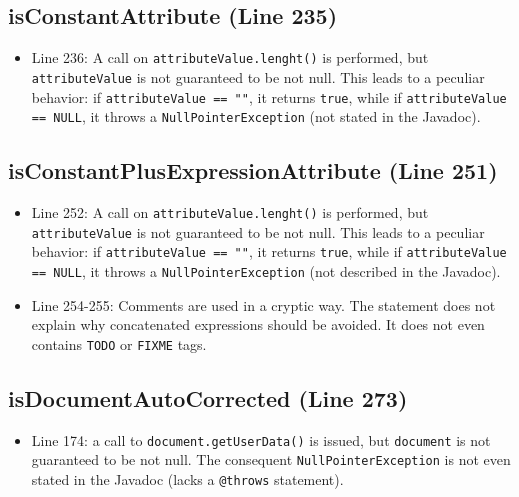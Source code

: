 \documentclass[11pt]{article} %
\begin{document}
\subsection{isConstantAttribute (Line 235)}
\begin{itemize}
	\item Line 236: A call on \texttt{attributeValue.lenght()} is performed, but \texttt{attributeValue} is not guaranteed to be not null. This leads to a peculiar behavior: if \texttt{attributeValue == ""}, it returns \texttt{true}, while if \texttt{attributeValue == NULL}, it throws a \texttt{NullPointerException} (not stated in the Javadoc).
\end{itemize}

\subsection{isConstantPlusExpressionAttribute (Line 251)}
\begin{itemize}
	\item Line 252: A call on \texttt{attributeValue.lenght()} is performed, but \texttt{attributeValue} is not guaranteed to be not null. This leads to a peculiar behavior: if \texttt{attributeValue == ""}, it returns \texttt{true}, while if \texttt{attributeValue == NULL}, it throws a \texttt{NullPointerException}
 (not described in the Javadoc).
	\item Line 254-255: Comments are used in a cryptic way. The statement does not explain why concatenated expressions should be avoided. It does not even contains \texttt{TODO} or \texttt{FIXME} tags.
\end{itemize}

\subsection{isDocumentAutoCorrected (Line 273)}
\begin{itemize}
	\item Line 174: a call to \texttt{document.getUserData()} is issued, but \texttt{document} is not guaranteed to be not null. The consequent  \texttt{NullPointerException} is not even stated in the Javadoc (lacks a  \texttt{@throws} statement).
\end{itemize}
\end{document}
